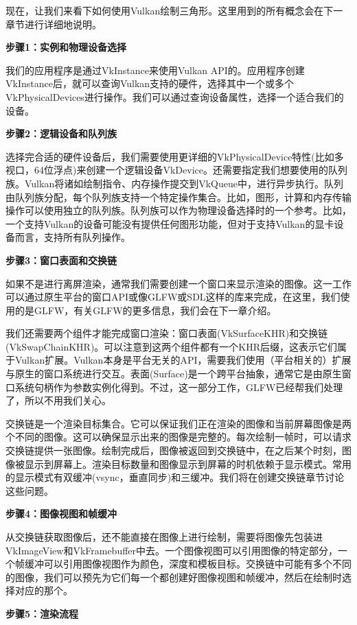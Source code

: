 \documentclass{ctexart}
\begin{document}
现在，让我们来看下如何使用Vulkan绘制三角形。这里用到的所有概念会在下一章节进行详细地说明。

\textbf{步骤1：实例和物理设备选择}

我们的应用程序是通过VkInstance来使用Vulkan API的。应用程序创建VkInstance后，就可以查询Vulkan支持的硬件，选择其中一个或多个VkPhysicalDevices进行操作。我们可以通过查询设备属性，选择一个适合我们的设备。

\textbf{步骤2：逻辑设备和队列族}

选择完合适的硬件设备后，我们需要使用更详细的VkPhysicalDevice特性(比如多视口，64位浮点)来创建一个逻辑设备VkDevice。还需要指定我们想要使用的队列族。Vulkan将诸如绘制指令、内存操作提交到VkQueue中，进行异步执行。队列由队列族分配，每个队列族支持一个特定操作集合。比如，图形，计算和内存传输操作可以使用独立的队列族。队列族可以作为物理设备选择时的一个参考。比如，一个支持Vulkan的设备可能没有提供任何图形功能，但对于支持Vulkan的显卡设备而言，支持所有队列操作。

\textbf{步骤3：窗口表面和交换链}

如果不是进行离屏渲染，通常我们需要创建一个窗口来显示渲染的图像。这一工作可以通过原生平台的窗口API或像GLFW或SDL这样的库来完成，在这里，我们使用的是GLFW，有关GLFW的更多信息，我们会在下一章介绍。

我们还需要两个组件才能完成窗口渲染：窗口表面(VkSurfaceKHR)和交换链(VkSwapChainKHR)。可以注意到这两个组件都有一个KHR后缀，这表示它们属于Vulkan扩展。Vulkan本身是平台无关的API，需要我们使用（平台相关的）扩展与原生的窗口系统进行交互。表面(Surface)是一个跨平台抽象，通常它是由原生窗口系统句柄作为参数实例化得到。不过，这一部分工作，GLFW已经帮我们处理了，所以不用我们关心。

交换链是一个渲染目标集合。它可以保证我们正在渲染的图像和当前屏幕图像是两个不同的图像。这可以确保显示出来的图像是完整的。每次绘制一帧时，可以请求交换链提供一张图像。绘制完成后，图像被返回到交换链中，在之后某个时刻，图像被显示到屏幕上。渲染目标数量和图像显示到屏幕的时机依赖于显示模式。常用的显示模式有双缓冲(vsync，垂直同步)和三缓冲。我们将在创建交换链章节讨论这些问题。

\textbf{步骤4：图像视图和帧缓冲}

从交换链获取图像后，还不能直接在图像上进行绘制，需要将图像先包装进VkImageView和VkFramebuffer中去。一个图像视图可以引用图像的特定部分，一个帧缓冲可以引用图像视图作为颜色，深度和模板目标。交换链中可能有多个不同的图像，我们可以预先为它们每一个都创建好图像视图和帧缓冲，然后在绘制时选择对应的那个。

\textbf{步骤5：渲染流程}
\end{document}
